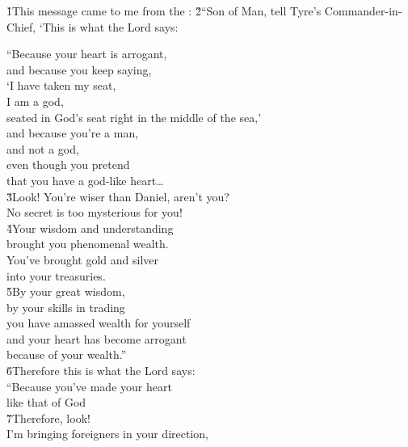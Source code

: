 \v{1}This message came to me from the : \v{2}``Son of Man, tell Tyre's Commander-in-Chief, `This is what the Lord  says:

\begin{poetry}
\poeml ``Because your heart is arrogant, \\
\poemll    and because you keep saying, \\
\poeml `I have taken my seat, \\
\poemll    I am a god, \\
\poemlll       seated in God's seat right in the middle of the sea,' \\
\poeml and because you're a man, \\
\poemll    and not a god, \\
\poeml even though you pretend \\
\poemll    that you have a god-like heart{\ldots} \\
\poeml \v{3}Look! You're wiser than Daniel, aren't you? \\
\poemll    No secret is too mysterious for you! \\
\poeml \v{4}Your wisdom and understanding \\
\poemll    brought you phenomenal wealth. \\
\poeml You've brought gold and silver \\
\poemll    into your treasuries. \\
\poeml \v{5}By your great wisdom, \\
\poemll    by your skills in trading \\
\poeml you have amassed wealth for yourself \\
\poemll    and your heart has become arrogant \\
\poemlll       because of your wealth.'' \\
\poeml \v{6}Therefore this is what the Lord  says: \\
\poeml ``Because you've made your heart \\
\poemll    like that of God \\
\poeml \v{7}Therefore, look! \\
\poemll    I'm bringing foreigners in your direction, \\

\end{poetry}
